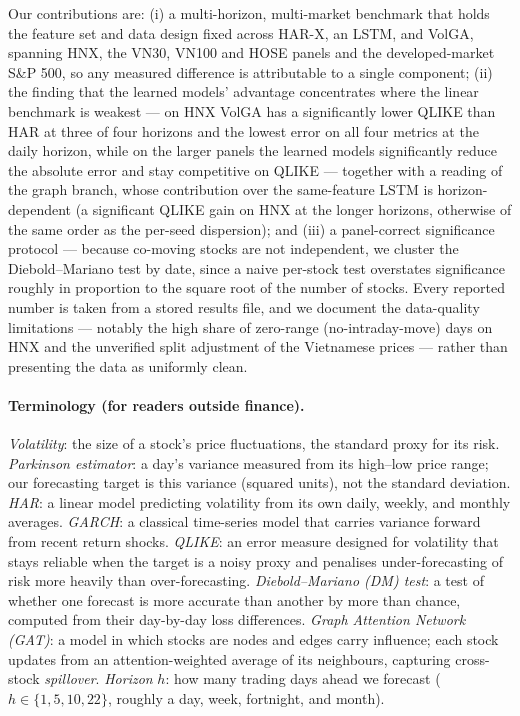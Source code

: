 \documentclass[runningheads]{llncs}
\begin{document}
Our contributions are: (i) a multi-horizon, multi-market benchmark that holds the feature set and
data design fixed across HAR-X, an LSTM, and VolGA, spanning HNX, the VN30, VN100 and HOSE panels and the developed-market S\&P 500, so any measured difference is attributable to a
single component; (ii) the finding that the learned models' advantage concentrates where the linear benchmark is
weakest --- on HNX VolGA has a significantly lower QLIKE than HAR at three of four horizons and the lowest
error on all four metrics at the daily horizon, while on the larger panels the learned models
significantly reduce the absolute error and stay competitive on QLIKE --- together with a reading
of the graph branch, whose contribution over the same-feature LSTM is horizon-dependent (a significant QLIKE
gain on HNX at the longer horizons, otherwise of the same order as the per-seed dispersion); and (iii) a
panel-correct significance protocol --- because
co-moving stocks are not independent, we cluster the Diebold--Mariano test by date, since a naive per-stock test
overstates significance roughly in proportion to the square root of the number of stocks.
Every reported number is taken from a stored results file, and we document the data-quality limitations ---
notably the high share of zero-range (no-intraday-move) days on HNX and the unverified split
adjustment of the Vietnamese prices --- rather than presenting the data as uniformly clean.

\paragraph{Terminology (for readers outside finance).}
\emph{Volatility}: the size of a stock's price fluctuations, the standard proxy for its risk.
\emph{Parkinson estimator}: a day's variance measured from its high--low price range; our forecasting target is
this variance (squared units), not the standard deviation.
\emph{HAR}: a linear model predicting volatility from its own daily, weekly, and monthly averages.
\emph{GARCH}: a classical time-series model that carries variance forward from recent return shocks.
\emph{QLIKE}: an error measure designed for volatility that stays reliable when the target is a noisy proxy and
penalises under-forecasting of risk more heavily than over-forecasting.
\emph{Diebold--Mariano (DM) test}: a test of whether one forecast is more accurate than another by more than
chance, computed from their day-by-day loss differences.
\emph{Graph Attention Network (GAT)}: a model in which stocks are nodes and edges carry influence; each stock
updates from an attention-weighted average of its neighbours, capturing cross-stock \emph{spillover}.
\emph{Horizon} $h$: how many trading days ahead we forecast ($h\in\{1,5,10,22\}$, roughly a day, week, fortnight,
and month).
\end{document}
